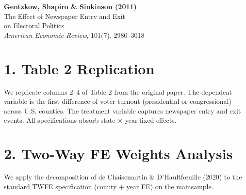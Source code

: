 \documentclass[12pt]{article}
\begin{document}
\begin{center}
{\Large\bfseries Gentzkow, Shapiro \& Sinkinson (2011)}\\
{\large The Effect of Newspaper Entry and Exit}\\
{\large on Electoral Politics}\\
\vspace{0.5em}
{\normalsize \textit{American Economic Review}, 101(7), 2980--3018}
\end{center}

\vspace{1em}

\section*{1. Table 2 Replication}

We replicate columns 2--4 of Table 2 from the original paper. 
The dependent variable is the first difference of voter turnout 
(presidential or congressional) across U.S. counties. 
The treatment variable captures newspaper entry and exit events. 
All specifications absorb state $\times$ year fixed effects.



\clearpage

\section*{2. Two-Way FE Weights Analysis}

We apply the decomposition of de Chaisemartin 
\& D'Haultf\oe uille (2020) to the standard TWFE specification 
(county + year FE) on the mainsample.


\end{document}
